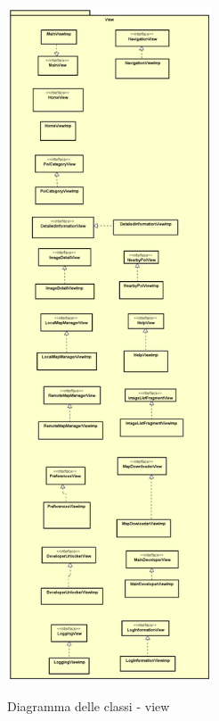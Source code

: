 \documentclass[../DefinizioneDiProdotto.tex,lanscape]{subfiles}
\begin{document}
\begin{figure}[H]
\centering
\includegraphics[height=20cm]{diagrams/ModelCompleteNoMethods/PNGpackage/view}
\label{viewPackage}
\caption{Diagramma delle classi - view}
\end{figure}
\end{document}
